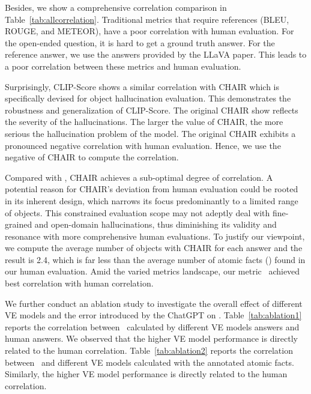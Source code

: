 Besides, we show a comprehensive correlation comparison in Table~\ref{tab:allcorrelation}. 
Traditional metrics that require references (\ie BLEU, ROUGE, and METEOR), have a poor correlation with human evaluation. For the open-ended question, it is hard to get a ground truth answer. For the reference answer, we use the answers provided by the LLaVA paper. This leads to a poor correlation between these metrics and human evaluation. 
% 

Surprisingly, CLIP-Score shows a similar correlation with CHAIR which is specifically devised for object hallucination evaluation. This demonstrates the robustness and generalization of CLIP-Score.
The original CHAIR show reflects the severity of the hallucinations. The larger the value of CHAIR, the more serious the hallucination problem of the model.
The original CHAIR exhibits a pronounced negative correlation with human evaluation. Hence, we use the negative of CHAIR to compute the correlation. 

Compared with \ours, CHAIR achieves a sub-optimal degree of correlation.  
A potential reason for CHAIR's deviation from human evaluation could be rooted in its inherent design, which narrows its focus predominantly to a limited range of objects. This constrained evaluation scope may not adeptly deal with fine-grained and open-domain hallucinations, thus diminishing its validity and resonance with more comprehensive human evaluations. To justify our viewpoint, we compute the average number of objects with CHAIR for each answer and the result is 2.4, which is far less than the average number of atomic facts () found in our human evaluation.  
Amid the varied metrics landscape, our metric \ours\ achieved best correlation with human correlation.


 {We further conduct an ablation study to investigate the overall effect of different VE models and the error introduced by the ChatGPT on \ours. }
Table~\ref{tab:ablation1} reports the correlation between \ours\ calculated by different VE models answers and human answers. We observed that the higher VE model performance is directly related to the human correlation. Table~\ref{tab:ablation2} reports the correlation between \ours\ and different VE models calculated with the annotated atomic facts. Similarly, the higher VE model performance is directly related to the human correlation. 


